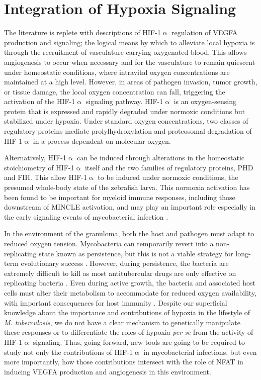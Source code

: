 \doublespacing

\section{Integration of Hypoxia Signaling}

The literature is replete with descriptions of HIF-1$\upalpha$ regulation of VEGFA production and signaling; the logical means by which to alleviate local hypoxia is through the recruitment of vasculature carrying oxygenated blood. This allows angiogenesis to occur when necessary and for the vasculature to remain quiescent under homeostatic conditions, where intravital oxygen concentrations are maintained at a high level. However, in areas of pathogen invasion, tumor growth, or tissue damage, the local oxygen concentration can fall, triggering the activation of the HIF-1$\upalpha$ signaling pathway. HIF-1$\upalpha$ is an oxygen-sensing protein that is expressed and rapidly degraded under normoxic conditions but stabilized under hypoxia. Under standard oxygen concentrations, two classes of regulatory proteins mediate prolylhydroxylation and proteosomal degradation of HIF-1$\upalpha$ in a process dependent on molecular oxygen.

Alternatively, HIF-1$\upalpha$ can be induced through alterations in the homeostatic stoichiometry of HIF-1$\upalpha$ itself and the two families of regulatory proteins, PHD and FIH. This allow HIF-1$\upalpha$ to be induced under normoxic conditions, the presumed whole-body state of the zebrafish larva. This normoxia activation has been found to be important for myeloid immune responses, including those downstream of MINCLE activation, and may play an important role especially in the early signaling events of mycobacterial infection \citep{Nishi2008, Schatz2016, Schoenen2014, Thompson2017}. 

In the environment of the granuloma, both the host and pathogen must adapt to reduced oxygen tension. Mycobacteria can temporarily revert into a non-replicating state known as persistence, but this is not a viable strategy for long-term evolutionary success \citep{Ehrt2018, Stewart2003, Manabe2000, Pandey2008, zuBentrup2001}. However, during persistence, the bacteria are extremely difficult to kill as most antitubercular drugs are only effective on replicating bacteria \citep{Veatch2018}. Even during active growth, the bacteria and associated host cells must alter their metabolism to accommodate for reduced oxygen availability, with important consequences for host immunity \citep{Harper2012, Tsai2006, Prosser2017, Rustad2009, Galagan2013}. Despite our superficial knowledge about the importance and contributions of hypoxia in the lifestyle of \textit{M. tuberculosis}, we do not have a clear mechanism to genetically manipulate these responses or to differentiate the roles of hypoxia \textit{per se} from the activity of HIF-1$\upalpha$ signaling. Thus, going forward, new tools are going to be required to study not only the contributions of HIF-1$\upalpha$ in mycobacterial infections, but even more importantly, how those contributions intersect with the role of NFAT in inducing VEGFA production and angiogenesis in this environment.

